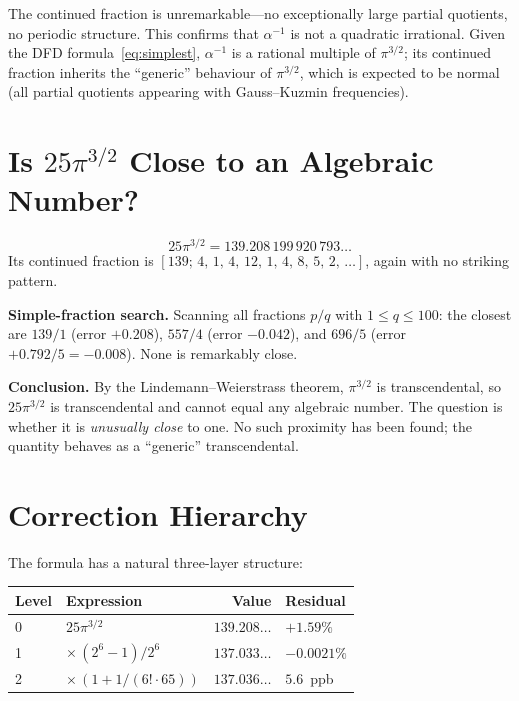 \documentclass[11pt]{article}
\begin{document}
\noindent
The continued fraction is unremarkable---no exceptionally large partial
quotients, no periodic structure.  This confirms that $\alpha^{-1}$ is not a
quadratic irrational.  Given the DFD formula~\eqref{eq:simplest}, $\alpha^{-1}$
is a rational multiple of $\pi^{3/2}$; its continued fraction inherits
the ``generic'' behaviour of $\pi^{3/2}$, which is expected to be normal
(all partial quotients appearing with Gauss--Kuzmin frequencies).

\section{Is $25\pi^{3/2}$ Close to an Algebraic Number?}
\label{sec:algebraic}

\[
25\pi^{3/2} = 139.208\,199\,920\,793\ldots
\]
Its continued fraction is $[139;\,4,\,1,\,4,\,12,\,1,\,4,\,8,\,5,\,2,\,\ldots]$,
again with no striking pattern.

\medskip\noindent
\textbf{Simple-fraction search.}
Scanning all fractions $p/q$ with $1\le q\le 100$:
the closest are $139/1$ (error $+0.208$), $557/4$ (error $-0.042$),
and $696/5$ (error $+0.792/5 = -0.008$).
None is remarkably close.

\medskip\noindent
\textbf{Conclusion.}
By the Lindemann--Weierstrass theorem, $\pi^{3/2}$ is transcendental,
so $25\pi^{3/2}$ is transcendental and cannot equal any algebraic number.
The question is whether it is \emph{unusually close} to one.  No such
proximity has been found; the quantity behaves as a ``generic'' transcendental.

\section{Correction Hierarchy}
\label{sec:hierarchy}

The formula has a natural three-layer structure:

\begin{center}
\begin{tabular}{llrl}
\toprule
\textbf{Level} & \textbf{Expression} & \textbf{Value} & \textbf{Residual} \\
\midrule
0 & $25\pi^{3/2}$                    & $139.208\ldots$ & $+1.59\%$ \\
1 & $\times\,(2^6-1)/2^6$            & $137.033\ldots$ & $-0.0021\%$ \\
2 & $\times\,(1+1/(6!\cdot 65))$     & $137.036\ldots$ & $5.6$~ppb \\
\bottomrule
\end{tabular}
\end{center}
\end{document}
